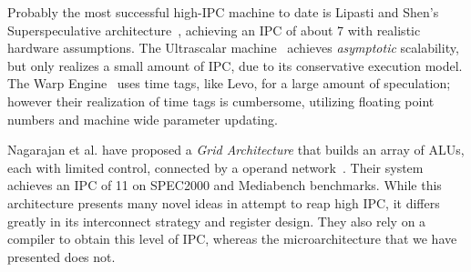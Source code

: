 
Probably the most successful high-IPC machine to date is
Lipasti and Shen's Superspeculative
architecture~\cite{Lip97}, achieving an IPC of
about 7 with realistic hardware assumptions.
The Ultrascalar machine~\cite{Hen00}
achieves {\em asymptotic} scalability,
but only realizes a small amount of IPC,
due to its conservative execution model.
The Warp Engine~\cite{Cle95}
uses time tags, like Levo, for a large amount of speculation;
however their realization of time
tags is cumbersome, utilizing floating point
numbers and machine wide parameter updating.

Nagarajan et al. have proposed a {\em Grid Architecture} that
builds an array of ALUs, each with limited control, connected
by a operand network~\cite{Nag01}.  Their system achieves an IPC of 11 on
SPEC2000 and Mediabench benchmarks.  While this architecture
presents many novel ideas in attempt to reap high IPC, it
differs greatly in its interconnect strategy and register design.
They also rely on a compiler to obtain this level of IPC, whereas
the microarchitecture that we have presented does not.

